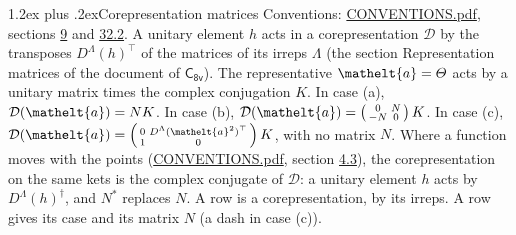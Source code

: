 \documentclass[10pt,a4paper]{article}
\makeatletter
\renewcommand\section{\@startsection{section}{1}{\z@}{-3ex plus -1ex minus -.2ex}%
  {1.2ex plus .2ex}{\normalfont\large\sffamily\bfseries\color{parttitle}}}
\numberwithin{equation}{section}
\newcommand{\eltfont}[1]{{\let\sigma\eltsigma\mathelt{#1}}}
\newcommand{\grp}[1]{\mathsf{#1}}
\newcommand{\elt}[1]{\eltfont{#1}}
\makeatother
\begin{document}
\section{Corepresentation matrices}\label{s:corep_matrices}
Conventions: \href{../../CONVENTIONS.pdf}{CONVENTIONS.pdf}, sections \href{../../../rotation/CONVENTIONS.pdf\#conv.9}{9} and \href{../../CONVENTIONS.pdf\#conv.32.2}{32.2}.
A unitary element $h$ acts in a corepresentation $\mathcal{D}$ by the transposes $D^{\Lambda}(h)^{\top}$ of the matrices of its irreps $\Lambda$ (the section Representation matrices of the document of \href{../../../rotation/data/pdf/C8v.pdf}{$\grp{C_{8v}}$}). The representative $\elt{a} = \varTheta$ acts by a unitary matrix times the complex conjugation $K$.
In case (a), $\mathcal{D}(\elt{a}) = NK$. In case (b), $\mathcal{D}(\elt{a}) = \left(\begin{smallmatrix} 0 & N \\ -N & 0 \end{smallmatrix}\right) K$. In case (c), $\mathcal{D}(\elt{a}) = \left(\begin{smallmatrix} 0 & D^{\Lambda}(\elt{a}^2)^{\top} \\ 1 & 0 \end{smallmatrix}\right) K$, with no matrix $N$.
Where a function moves with the points (\href{../../CONVENTIONS.pdf}{CONVENTIONS.pdf}, section \href{../../../rotation/CONVENTIONS.pdf\#conv.4.3}{4.3}), the corepresentation on the same kets is the complex conjugate of $\mathcal{D}$: a unitary element $h$ acts by $D^{\Lambda}(h)^{\dagger}$, and $N^{*}$ replaces $N$.
A row is a corepresentation, by its irreps. A row gives its case and its matrix $N$ (a dash in case (c)).
\end{document}
